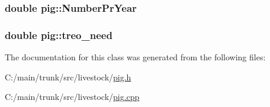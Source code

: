 \label{classpig_abcbba53abf12eb308dc0222c6d4ce98a}
\hypertarget{classpig_afb0194a6ded917d3d286165e25cec0cd}{
\subsubsection[{NumberPrYear}]{\setlength{\rightskip}{0pt plus 5cm}double {\bf pig::NumberPrYear}}}
\label{classpig_afb0194a6ded917d3d286165e25cec0cd}
\hypertarget{classpig_a075e78b1499a2a990cfc8ca062e8654b}{
\subsubsection[{treo\_\-need}]{\setlength{\rightskip}{0pt plus 5cm}double {\bf pig::treo\_\-need}}}
\label{classpig_a075e78b1499a2a990cfc8ca062e8654b}


The documentation for this class was generated from the following files:\begin{DoxyCompactItemize}
\item 
C:/main/trunk/src/livestock/\hyperlink{pig_8h}{pig.h}\item 
C:/main/trunk/src/livestock/\hyperlink{pig_8cpp}{pig.cpp}\end{DoxyCompactItemize}
